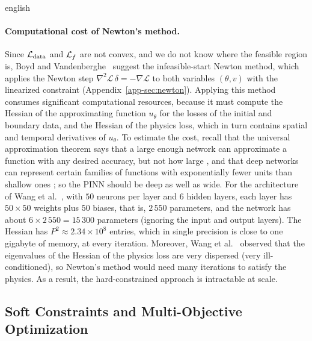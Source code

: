 \documentclass[0000.tex]{subfiles}
\begin{document}
\begin{hyphenrules}{english}
\paragraph{Computational cost of Newton's method.}
Since $\mathcal{L}_{\mathrm{data}}$ and $\mathcal{L}_f$ are not convex, and we do not know where the feasible region
is, Boyd and Vandenberghe~\cite{boyd2004} suggest the infeasible-start Newton method, which applies the Newton step
$\nabla^2\mathscr{L}\,\delta=-\nabla\mathscr{L}$ to both variables $(\theta,v)$ with the linearized
constraint (Appendix~\ref{app-sec:newton}).
Applying this method consumes significant computational resources, because it must compute the Hessian
of the approximating function $u_\theta$ for the losses of the initial and boundary data, and the
Hessian of the physics loss, which in turn contains spatial and temporal derivatives of $u_\theta$. To
estimate the cost, recall that the universal approximation theorem says that a large enough network
can approximate a function with any desired accuracy, but not how large \cite{lecun2015}, and that
deep networks can represent certain families of functions with exponentially fewer units than shallow
ones \cite{delalleau2011}; so the PINN should be deep as well as wide. For the architecture of
Wang et al.~\cite{wang2021gradient}, with $50$ neurons per layer and $6$ hidden layers, each layer has
$50\times50$ weights plus $50$ biases, that is, $2\,550$ parameters, and the network has about
$6\times2\,550=15\,300$ parameters (ignoring the input and output layers). The Hessian has
$P^2\approx2.34\times10^{8}$ entries, which in single precision is close to one gigabyte of memory, at
every iteration. Moreover, Wang et al.~\cite{wang2021gradient} observed that the eigenvalues of the Hessian of
the physics loss are very dispersed (very ill-conditioned), so Newton's method would need many
iterations to satisfy the physics. As a result, the hard-constrained approach is intractable at scale.

\subsection{Soft Constraints and Multi-Objective Optimization}


\end{hyphenrules}
\end{document}
